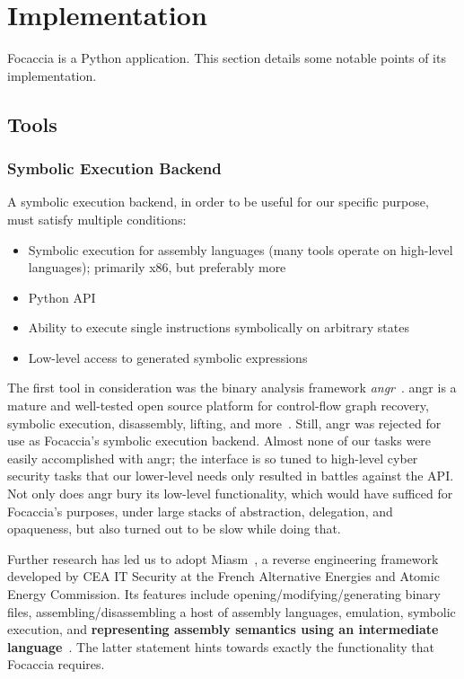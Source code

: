 \chapter{Implementation}\label{chapter:implementation}

Focaccia is a Python application. This section details some notable points of its implementation.

\section{Tools}

\subsection{Symbolic Execution Backend}

A symbolic execution backend, in order to be useful for our specific purpose, must satisfy multiple conditions:

\begin{itemize}
    \item Symbolic execution for assembly languages (many tools operate on high-level languages); primarily x86, but
        preferably more
    \item Python API
    \item Ability to execute single instructions symbolically on arbitrary states
    \item Low-level access to generated symbolic expressions
\end{itemize}

The first tool in consideration was the binary analysis framework \textit{angr}~\cite{shoshitaishvili2016state}. angr is
a mature and well-tested open source platform for control-flow graph recovery, symbolic execution, disassembly, lifting,
and more~\cite{AngrWebsite2024Mar}. Still, angr was rejected for use as Focaccia's symbolic execution backend.  Almost
none of our tasks were easily accomplished with angr; the interface is so tuned to high-level cyber security tasks that
our lower-level needs only resulted in battles against the API\@. Not only does angr bury its low-level functionality,
which would have sufficed for Focaccia's purposes, under large stacks of abstraction, delegation, and opaqueness, but
also turned out to be slow while doing that.

Further research has led us to adopt Miasm~\cite{desclaux2012miasm}, a reverse engineering framework developed by CEA IT
Security at the French Alternative Energies and Atomic Energy Commission. Its features include
opening/modifying/generating binary files, assembling/disassembling a host of assembly languages, emulation, symbolic
execution, and \textbf{representing assembly semantics using an intermediate language}~\cite{cea-sec2024Mar}. The latter
statement hints towards exactly the functionality that Focaccia requires.

